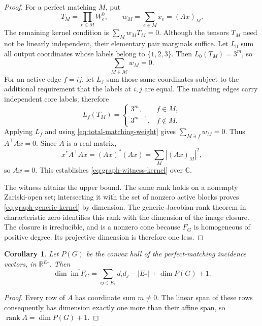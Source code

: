 \documentclass[11pt]{article}
\newtheorem{corollary}[theorem]{Corollary}
\theoremstyle{remark}\newtheorem{remark}[theorem]{Remark}
\DeclareMathOperator{\rank}{rank}
\newcommand{\C}{\mathbb C}
\begin{document}
\begin{proof}
For a perfect matching $M$, put
\[
 T_M=\prod_{e\in M}W_e^0,
 \qquad w_M=\sum_{e\in M}x_e=(Ax)_M.
\]
The remaining kernel condition is $\sum_Mw_MT_M=0$. Although the
tensors $T_M$ need not be linearly independent, their elementary
pair marginals suffice. Let $L_0$ sum all output coordinates whose
labels belong to $\{1,2,3\}$. Then $L_0(T_M)=3^m$, so
\begin{equation}\label{eq:total-matching-weight}
 \sum_{M\in\mathcal M}w_M=0.
\end{equation}
For an active edge $f=ij$, let $L_f$ sum those same coordinates subject
to the additional requirement that the labels at $i,j$ are equal.
The matching edges carry independent core labels; therefore
\[
 L_f(T_M)=
 \begin{cases}
 3^m,&f\in M,\\
 3^{m-1},&f\notin M.
 \end{cases}
\]
Applying $L_f$ and using \eqref{eq:total-matching-weight} gives
$\sum_{M\ni f}w_M=0$. Thus $A^{\top}Ax=0$.
Since $A$ is a real matrix,
\[
 x^*A^{\top}Ax=(Ax)^*(Ax)=\sum_M|(Ax)_M|^2,
\]
so $Ax=0$. This establishes \eqref{eq:graph-witness-kernel} over
$\C$.

The witness attains the upper bound. The same rank holds on a nonempty
Zariski-open set; intersecting it with the set of nonzero active
blocks proves \eqref{eq:graph-generic-kernel} by dimension. The generic
Jacobian-rank theorem in characteristic zero identifies this rank
with the dimension of the image closure. The closure is irreducible,
and is a nonzero cone because $F_G$ is homogeneous of positive degree.
Its projective dimension is therefore one less.
\end{proof}

\begin{corollary}\label{cor:polytope-dimension}
Let $P(G)$ be the convex hull of the perfect-matching incidence
vectors, in $\mathbb R^{E_*}$. Then
\[
 \dim\overline{\operatorname{im}F_G}
 =\sum_{ij\in E_*}d_id_j-|E_*|+\dim P(G)+1.
\]
\end{corollary}
\begin{proof}
Every row of $A$ has coordinate sum $m\ne0$. The linear span of these
rows consequently has dimension exactly one more than their affine
span, so $\rank A=\dim P(G)+1$.
\end{proof}
\end{document}
